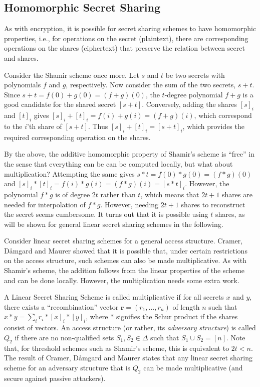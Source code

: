 \documentclass[11pt]{article}
\newcommand{\bfr}{\mathbf{r}}
\begin{document}
\subsection*{Homomorphic Secret Sharing}
As with encryption, it is possible for secret sharing schemes to have homomorphic properties, i.e., for operations on the secret (plaintext), there are corresponding operations on the shares (ciphertext) that preserve the relation between secret and shares. 

Consider the Shamir scheme once more. Let $s$ and $t$ be two secrets with polynomials $f$ and $g$, respectively. Now consider the sum of the two secrets, $s + t$. Since $s + t = f(0) + g(0) = (f+g)(0)$, the $t$-degree polynomial $f+g$ is a good candidate for the shared secret $[s+t]$. Conversely, adding the shares $[s]_i$ and $[t]_i$ gives $[s]_i + [t]_i = f(i) + g(i) = (f+g)(i)$, which correspond to the $i$'th share of $[s+t]$. Thus $[s]_i + [t]_i = [s+t]_i$, which provides the required corresponding operation on the shares. 

By the above, the additive homomorphic property of Shamir's scheme is ``free'' in the sense that everything can be can be computed locally, but what about multiplication? Attempting the same gives $s * t = f(0)*g(0) = (f*g)(0)$ and $[s]_i * [t]_i = f(i)*g(i) = (f*g)(i) = [s*t]_i$. However, the polynomial $f*g$ is of degree $2t$ rather than $t$, which means that $2t+1$ shares are needed for interpolation of $f*g$. However, needing $2t+1$ shares to reconstruct the secret seems cumbersome. It turns out that it is possible using $t$ shares, as will be shown for general linear secret sharing schemes in the following.

Consider linear secret sharing schemes for a general access structure. Cramer, D{\aa}mgard and Maurer \cite{CraDamMau00} showed that it is possible that, under certain restrictions on the access structure, such schemes can also be made multiplicative.  As with Shamir's scheme, the addition follows from the linear properties of the scheme and can be done locally. However, the multiplication needs some extra work. 

A Linear Secret Sharing Scheme is called multiplicative if for all secrets $x$ and $y$, there exists a ``recombination'' vector $\bfr = (r_1,\ldots,r_n)$ of length $n$ such that $x*y = \sum_i r_i*[x]_i * [y]_i$, where $*$ signifies the Schur product if the shares consist of vectors. An access structure (or rather, its {\it adversary structure}) is called $Q_2$ if there are no non-qualified sets $S_1,S_2 \in \Delta$ such that $S_1 \cup S_2 = [n]$. Note that, for threshold schemes such as Shamir's scheme, this is equivalent to $2t < n$. The result of Cramer, D{\aa}mgard and Maurer states that any linear secret sharing scheme for an adversary structure that is $Q_2$ can be made multiplicative (and secure against passive attackers).
\end{document}
